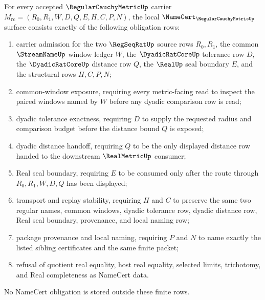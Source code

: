 \begin{theorem}
\label{thm:regular-cauchy-metric-namecert-obligations}
For every accepted $\RegularCauchyMetricUp$ carrier $M_{\mathrm{rc}}=(R_0,R_1,W,D,Q,E,H,C,P,N)$, the local $\NameCert_{\RegularCauchyMetricUp}$ surface consists exactly of the following obligation rows:
\begin{enumerate}
\item carrier admission for the two $\RegSeqRatUp$ source rows $R_0,R_1$, the common $\StreamNameUp$ window ledger $W$, the $\DyadicRatCoreUp$ tolerance row $D$, the $\DyadicRatCoreUp$ distance row $Q$, the $\RealUp$ seal boundary $E$, and the structural rows $H,C,P,N$;
\item common-window exposure, requiring every metric-facing read to inspect the paired windows named by $W$ before any dyadic comparison row is read;
\item dyadic tolerance exactness, requiring $D$ to supply the requested radius and comparison budget before the distance bound $Q$ is exposed;
\item dyadic distance handoff, requiring $Q$ to be the only displayed distance row handed to the downstream $\RealMetricUp$ consumer;
\item Real seal boundary, requiring $E$ to be consumed only after the route through $R_0,R_1,W,D,Q$ has been displayed;
\item transport and replay stability, requiring $H$ and $C$ to preserve the same two regular names, common windows, dyadic tolerance row, dyadic distance row, Real seal boundary, provenance, and local naming row;
\item package provenance and local naming, requiring $P$ and $N$ to name exactly the listed sibling certificates and the same finite packet;
\item refusal of quotient real equality, host real equality, selected limits, trichotomy, and Real completeness as NameCert data.
\end{enumerate}
No NameCert obligation is stored outside these finite rows.
\end{theorem}
